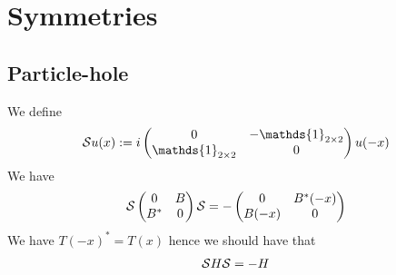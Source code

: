 \documentclass[11pt,a4paper,reqno,french,tikz]{amsart}
\newcommand{\mat}[1]{\begin{pmatrix} #1 \end{pmatrix}} %
\def\1{{\mathds{1}}}
\def\1{{\mathds{1}}}
\begin{document}
\section{Symmetries}%
\label{sec:symmetries}


\subsection{Particle-hole}%
\label{sub:particle_hole}

We define
\begin{align*}
\cS u(x) := i \mat{0 & -\1_{2\times 2} \\ \1_{2\times 2} & 0} u(-x)
\end{align*}
We have
\begin{align*}
\cS \mat{0 & B \\ B^* & 0} \cS = -\mat{0 & B^*(-x) \\ B(-x) & 0}
\end{align*}
We have $T(-x)^* = T(x)$ hence we should have that
\begin{align*}
\mathcal{S} H \mathcal{S} = - H
\end{align*}
\end{document}

